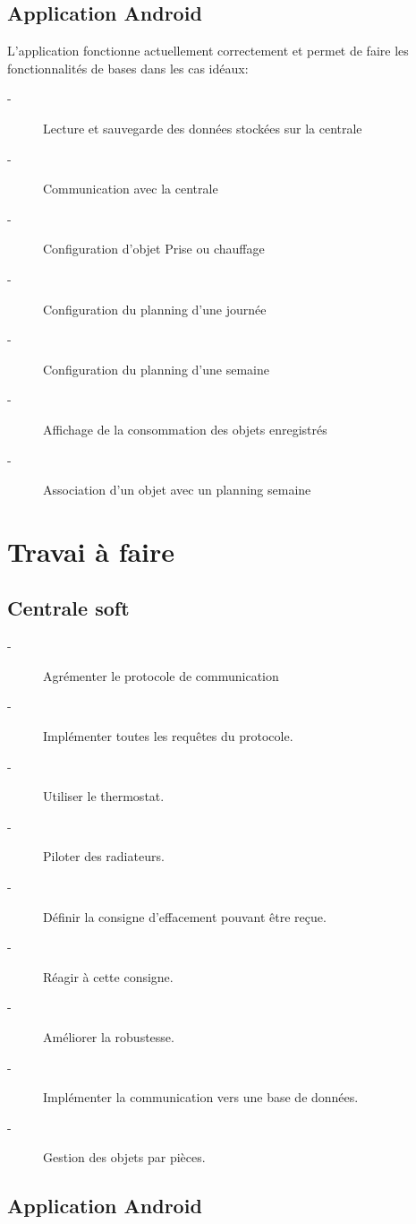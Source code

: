 \documentclass[11pt,a4paper]{report} %
\begin{document}
			\subsection{Application Android}
L'application fonctionne actuellement correctement et permet de faire les fonctionnalités de bases dans les cas idéaux:\newline
\begin{description}
	\item[-] Lecture et sauvegarde des données stockées sur la centrale
	\item[-] Communication avec la centrale
	\item[-] Configuration d'objet Prise ou chauffage
	\item[-] Configuration du planning d'une journée
	\item[-] Configuration du planning d'une semaine
	\item[-] Affichage de la consommation des objets enregistrés
	\item[-] Association d'un objet avec un planning semaine
\end{description}

	
\newpage	
		\section{Travai à faire }
		
			\subsection{Centrale soft}
\begin{description}
	\item[-] Agrémenter le protocole de communication
	\item[-] Implémenter toutes les requêtes du protocole.
	\item[-] Utiliser le thermostat.
	\item[-] Piloter des radiateurs.
	\item[-] Définir la consigne d'effacement pouvant être reçue.
	\item[-] Réagir à cette consigne.
	\item[-] Améliorer la robustesse.
	\item[-] Implémenter la communication vers une base de données.
	\item[-] Gestion des objets par pièces.
	
\end{description}	

			
			\subsection{Application Android}
\end{document}
